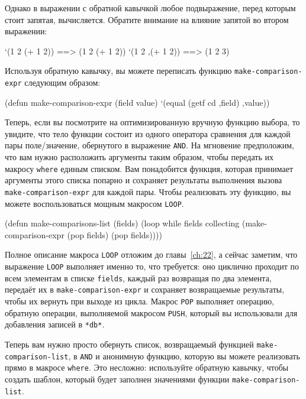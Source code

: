 Однако в выражении с обратной кавычкой любое подвыражение, перед которым стоит запятая,
вычисляется. Обратите внимание на влияние запятой во втором выражении:

\begin{myverb}
`(1 2 (+ 1 2))  ==> (1 2 (+ 1 2))
`(1 2 ,(+ 1 2)) ==> (1 2 3)
\end{myverb}

Используя обратную кавычку, вы можете переписать функцию \lstinline{make-comparison-expr} следующим образом:

\begin{myverb}
(defun make-comparison-expr (field value)
  `(equal (getf cd ,field) ,value))
\end{myverb}

Теперь, если вы посмотрите на оптимизированную вручную функцию выбора, то увидите, что
тело функции состоит из одного оператора сравнения для каждой пары поле/значение,
обернутого в выражение \lstinline{AND}. На мгновение предположим, что вам нужно расположить
аргументы таким образом, чтобы передать их макросу \lstinline{where} единым списком. Вам
понадобится функция, которая принимает аргументы этого списка попарно и сохраняет
результаты выполнения вызова \lstinline{make-comparison-expr} для каждой пары. Чтобы
реализовать эту функцию, вы можете воспользоваться мощным макросом \lstinline{LOOP}.

\begin{myverb}
(defun make-comparisons-list (fields)
  (loop while fields
     collecting (make-comparison-expr (pop fields) (pop fields))))
\end{myverb}

Полное описание макроса \lstinline{LOOP} отложим до главы~\ref{ch:22}, а сейчас заметим, что выражение
\lstinline{LOOP} выполняет именно то, что требуется: оно циклично проходит по всем элементам в
списке \lstinline{fields}, каждый раз возвращая по два элемента, передаёт их в
\lstinline{make-comparison-expr} и сохраняет возвращаемые результаты, чтобы их вернуть при
выходе из цикла. Макрос \lstinline{POP} выполняет операцию, обратную операции, выполняемой макросом
\lstinline{PUSH}, который вы использовали для добавления записей в \lstinline{*db*}.

Теперь вам нужно просто обернуть список, возвращаемый функцией \lstinline{make-comparison-list},
в \lstinline{AND} и анонимную функцию, которую вы можете реализовать прямо в макросе
\lstinline{where}. Это несложно: используйте обратную кавычку, чтобы создать шаблон, который
будет заполнен значениями функции \lstinline{make-comparison-list}.

